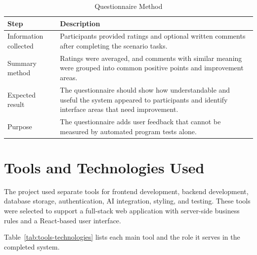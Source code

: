 \begin{table}[H]
	\centering
	\BlackbookTableSetup
	\caption{Questionnaire Method}
	\label{tab:questionnaire-method}
	\begin{tabularx}{\textwidth}{|B{3.1cm}|Z|}
		\hline
		\textbf{Step} & \textbf{Description} \\ \hline
		Information collected & Participants provided ratings and optional written comments after completing the scenario tasks. \\ \hline
		Summary method & Ratings were averaged, and comments with similar meaning were grouped into common positive points and improvement areas. \\ \hline
		Expected result & The questionnaire should show how understandable and useful the system appeared to participants and identify interface areas that need improvement. \\ \hline
		Purpose & The questionnaire adds user feedback that cannot be measured by automated program tests alone. \\ \hline
	\end{tabularx}
\end{table}

\section{Tools and Technologies Used}
The project used separate tools for frontend development, backend development, database storage, authentication, AI integration, styling, and testing. These tools were selected to support a full-stack web application with server-side business rules and a React-based user interface.

Table~\ref{tab:tools-technologies} lists each main tool and the role it serves in the completed system.

